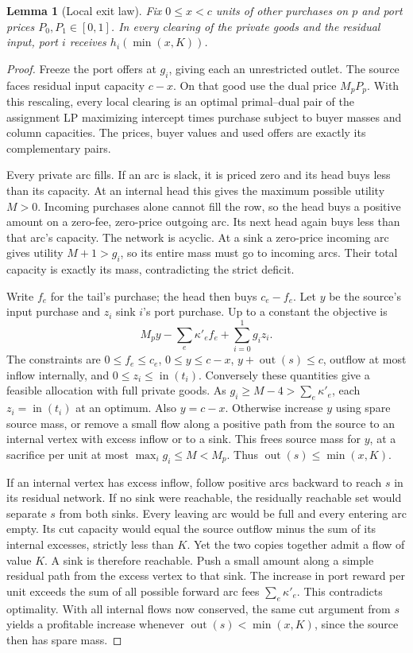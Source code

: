 \documentclass[11pt,oneside,openany,notitlepage]{report}
\newtheorem{lemma}[theorem]{Lemma}
\begin{document}
\begin{lemma}[Local exit law]\label{lem:exit-offers}
Fix \(0\le x<c\) units of other purchases on \(p\) and port prices
\(P_0,P_1\in[0,1]\). In every clearing of the private goods and the
residual input, port \(i\) receives \(h_i(\min(x,K))\).
\end{lemma}
\begin{proof}
Freeze the port offers at \(g_i\), giving each an unrestricted outlet.
The source faces residual input capacity \(c-x\). On that good use the
dual price \(M_pP_p\). With this rescaling, every local clearing is an
optimal primal--dual pair of the assignment LP maximizing intercept
times purchase subject to buyer masses and column capacities. The prices,
buyer values and used offers are exactly its complementary pairs.

Every private arc fills. If an arc is slack, it is priced zero and its
head buys less than its capacity. At an internal head this gives the
maximum possible utility \(M>0\). Incoming purchases alone cannot fill
the row, so the head buys a positive amount on a zero-fee, zero-price
outgoing arc. Its next head again buys less than that arc's capacity.
The network is acyclic. At a sink a zero-price incoming arc gives utility
\(M+1>g_i\), so its entire mass must go to incoming arcs. Their total
capacity is exactly its mass, contradicting the strict deficit.

Write \(f_e\) for the tail's purchase; the head then buys \(c_e-f_e\).
Let \(y\) be the source's input purchase and \(z_i\) sink \(i\)'s port
purchase. Up to a constant the objective is
\[
                      M_py-\sum_e\kappa'_ef_e+\sum_{i=0}^1 g_i z_i .
\]
The constraints are \(0\le f_e\le c_e\), \(0\le y\le c-x\),
\(y+\operatorname{out}(s)\le c\), outflow at most inflow internally,
and \(0\le z_i\le\operatorname{in}(t_i)\). Conversely these quantities
give a feasible allocation with full private goods. As
\(g_i\ge M-4>\sum_e\kappa'_e\), each \(z_i=\operatorname{in}(t_i)\)
at an optimum. Also \(y=c-x\). Otherwise increase \(y\) using spare
source mass, or remove a small flow along a positive path from the source
to an internal vertex with excess inflow or to a sink. This frees source
mass for \(y\), at a sacrifice per unit at most \(\max_i g_i\le M<M_p\).
Thus \(\operatorname{out}(s)\le\min(x,K)\).

If an internal vertex has excess inflow, follow positive arcs backward
to reach \(s\) in its residual network. If no sink were reachable, the
residually reachable set would separate \(s\) from both sinks. Every
leaving arc would be full and every entering arc empty. Its cut capacity
would equal the source outflow minus the sum of its internal excesses,
strictly less than \(K\). Yet the two copies together admit a flow of value
\(K\). A sink is therefore reachable. Push a small amount along a simple
residual path from the excess vertex to that sink. The increase in port
reward per unit exceeds the sum of all possible forward arc fees
\(\sum_e\kappa'_e\). This contradicts optimality. With all internal
flows now conserved, the same cut argument from \(s\) yields a profitable
increase whenever \(\operatorname{out}(s)<\min(x,K)\), since the source
then has spare mass.


\end{proof}
\end{document}
